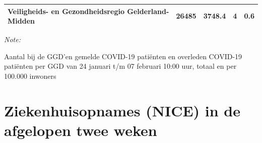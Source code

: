 \documentclass[
  english,
  man,floatsintext]{apa6}
\begin{document}
\begin{table}
\begin{threeparttable}
\begin{tabular}{lrrrr}
Veiligheids- en Gezondheidsregio Gelderland-Midden & 26485 & 3748.4 & 4 & 0.6\\
\bottomrule
\end{tabular}
\begin{tablenotes}
\item \textit{Note: } 
\item Aantal bij de GGD’en gemelde COVID-19 patiënten en overleden COVID-19 patiënten per GGD van 24 januari t/m 07 februari 10:00 uur, totaal en per 100.000 inwoners
\end{tablenotes}
\end{threeparttable}
\endgroup{}
\end{table}

\newpage

\hypertarget{ziekenhuisopnames-nice-in-de-afgelopen-twee-weken}{%
\section{Ziekenhuisopnames (NICE) in de afgelopen twee weken}\label{ziekenhuisopnames-nice-in-de-afgelopen-twee-weken}}
\end{document}
